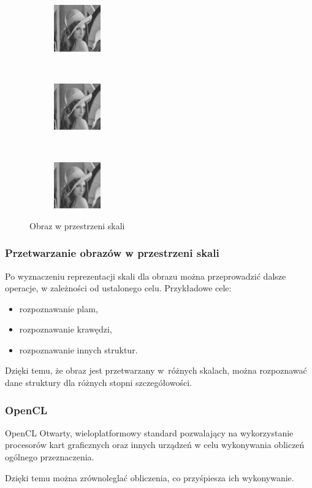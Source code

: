 \begin{frame}
\begin{figure}[h]
\begin{center}
		 
\begin{subfigure}[b]{2cm}
                 \centering
                 \includegraphics[width=2cm]{Lena_scales4.jpg}
         \end{subfigure}%
		 ~
		 \begin{subfigure}[b]{2cm}
                 \centering
                 \includegraphics[width=2cm]{Lena_scales5.jpg}
         \end{subfigure}%
		 ~
\begin{subfigure}[b]{2cm}
                 \centering
                 \includegraphics[width=2cm]{Lena_scales6.jpg}
         \end{subfigure}%
\caption{Obraz w przestrzeni skali}
\label{lena_scales}
\end{center}
\end{figure}
\end{frame}


\begin{frame}
\frametitle{Przetwarzanie obrazów w przestrzeni skali}

Po wyznaczeniu reprezentacji skali dla obrazu można przeprowadzić dalsze operacje, w zależności od ustalonego celu. Przykładowe cele:
\begin{itemize}
\item rozpoznawanie plam,
\item rozpoznawanie krawędzi,
\item rozpoznawanie innych struktur.
\end{itemize}
Dzięki temu, że obraz jest przetwarzany w~różnych skalach, można rozpoznawać dane struktury dla różnych stopni szczegółowości.
\end{frame}

\begin{frame}
\frametitle{OpenCL}
\begin{block}{OpenCL}
Otwarty, wieloplatformowy standard pozwalający na wykorzystanie procesorów kart graficznych oraz innych urządzeń w celu wykonywania obliczeń ogólnego przeznaczenia.
\end{block}

Dzięki temu można zrównoleglać obliczenia, co przyśpiesza ich wykonywanie.

\end{frame}


